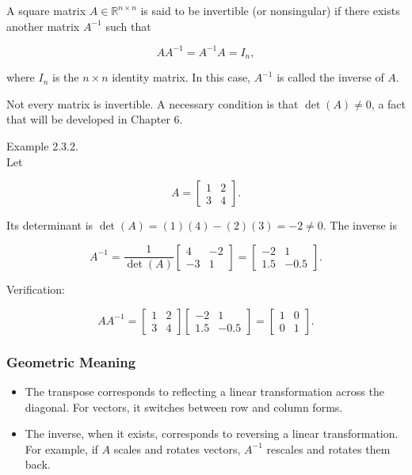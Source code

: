 \documentclass[
  12pt,
  a4paper,
]{article}
\begin{document}
A square matrix \(A \in \mathbb{R}^{n \times n}\) is said to be
invertible (or nonsingular) if there exists another matrix \(A^{-1}\)
such that

\[AA^{-1} = A^{-1}A = I_n,\]

where \(I_n\) is the \(n \times n\) identity matrix. In this case,
\(A^{-1}\) is called the inverse of \(A\).

Not every matrix is invertible. A necessary condition is that
\(\det(A) \neq 0\), a fact that will be developed in Chapter 6.

Example 2.3.2.\\
Let

\[A = \begin{bmatrix}
1 & 2 \\
3 & 4
\end{bmatrix}.\]

Its determinant is \(\det(A) = (1)(4) - (2)(3) = -2 \neq 0\). The
inverse is

\[A^{-1} = \frac{1}{\det(A)} \begin{bmatrix}
4 & -2 \\
-3 & 1
\end{bmatrix}
=
\begin{bmatrix}
-2 & 1 \\
1.5 & -0.5
\end{bmatrix}.\]

Verification:

\[AA^{-1} = \begin{bmatrix}
1 & 2 \\
3 & 4
\end{bmatrix}
\begin{bmatrix}
-2 & 1 \\
1.5 & -0.5
\end{bmatrix}
=
\begin{bmatrix}
1 & 0 \\
0 & 1
\end{bmatrix}.\]

\subsubsection{Geometric Meaning}\label{geometric-meaning-2}

\begin{itemize}
\item
  The transpose corresponds to reflecting a linear transformation across
  the diagonal. For vectors, it switches between row and column forms.
\item
  The inverse, when it exists, corresponds to reversing a linear
  transformation. For example, if \(A\) scales and rotates vectors,
  \(A^{-1}\) rescales and rotates them back.
\end{itemize}
\end{document}

